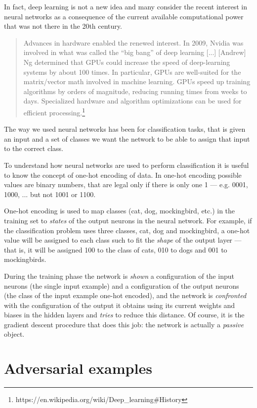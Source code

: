In fact, deep learning is not a new idea and many consider the recent
interest in neural networks as a consequence of the current available
computational power that was not there in the 20th century.

\begin{quote}
  Advances in hardware enabled the renewed interest. In 2009, Nvidia
  was involved in what was called the ``big bang'' of deep learning
  [...] [Andrew] Ng determined that GPUs could increase the speed of
  deep-learning systems by about 100 times. In particular, GPUs are
  well-suited for the matrix/vector math involved in machine learning.
  GPUs speed up training algorithms by orders of magnitude, reducing
  running times from weeks to days. Specialized hardware and algorithm
  optimizations can be used for efficient
  processing.\footnote{https://en.wikipedia.org/wiki/Deep\_learning\#History}
\end{quote}

The way we used neural networks has been for classification tasks, that
is given an input and a set of classes we want the network to be able
to assign that input to the correct class.

To understand how neural networks are used to perform classification it
is useful to know the concept of one-hot encoding of data. In one-hot
encoding possible values are binary numbers, that are legal only if
there is only one 1 --- e.g. 0001, 1000, ... but not 1001 or 1100.

One-hot encoding is used to map classes (cat, dog, mockingbird, etc.)
in the training set to \emph{states} of the output neurons in the
neural network. For example, if the classification problem uses three
classes, cat, dog and mockingbird, a one-hot value will be assigned to
each class such to fit the \emph{shape} of the output layer --- that
is, it will be assigned 100 to the class of cats, 010 to dogs and 001
to mockingbirds.

During the training phase the network is \emph{shown} a
configuration of the input neurons (the single input example) and a
configuration of the output neurons (the class of the input example
one-hot encoded), and the network is \emph{confronted} with the
configuration of the output it obtains using its current weights and biases
in the hidden layers and \emph{tries} to reduce this distance. Of
course, it is the gradient descent procedure that does this job: the
network is actually a \emph{passive} object.

\section{Adversarial examples}
\label{sec:adversarial-examples}

